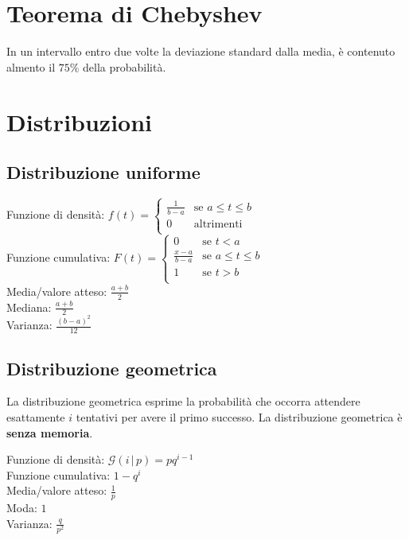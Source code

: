 \documentclass[10pt,landscape]{article}
\begin{document}
\begin{multicols}{3}
\section{Teorema di Chebyshev}
In un intervallo entro due volte la deviazione standard dalla media, è contenuto almento il $75\%$ della probabilità. \\

\section{Distribuzioni}

\subsection{Distribuzione uniforme}
Funzione di densità: $f(t) = \begin{cases}
	\frac{1}{b - a} & \text{se } a \le t \le b \\
	0 & \text{altrimenti} \\
\end{cases}$ \\
Funzione cumulativa: $F(t) = \begin{cases}
	0 & \text{se } t < a \\
	\frac{x - a}{b - a} & \text{se } a \le t \le b \\
	1 & \text{se } t > b \\
\end{cases}$ \\
Media/valore atteso: $\frac{a + b}{2}$ \\
Mediana: $\frac{a + b}{2}$ \\
Varianza: $\frac{(b - a)^2}{12}$ \\

\subsection{Distribuzione geometrica}
La distribuzione geometrica esprime la probabilità che occorra attendere esattamente $i$ tentativi per avere il primo successo.
La distribuzione geometrica è \textbf{senza memoria}. \\

\vspace{1em}

Funzione di densità: $\mathcal{G}(i \, | \, p) = pq^{i-1}$ \\
Funzione cumulativa: $1 - q^i$ \\
Media/valore atteso: $\frac{1}{p}$ \\
Moda: $1$ \\
Varianza: $\frac{q}{p^2}$ \\


\end{multicols}
\end{document}

